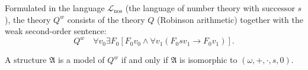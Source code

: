 Formulated in the language $\mathcal{L}_{\text{nos}}$ (the language of number theory with successor $s$), the theory $Q^w$ consists of the theory $Q$ (Robinson arithmetic) together with the weak second-order sentence:
$$Q^w \quad \forall v_0 \exists F_0 [F_0 v_0 \land \forall v_1 (F_0 s v_1 \rightarrow F_0 v_1)].$$

A structure $\mathfrak{A}$ is a model of $Q^w$ if and only if $\mathfrak{A}$ is isomorphic to $(\omega, +, \cdot, s, 0)$.
